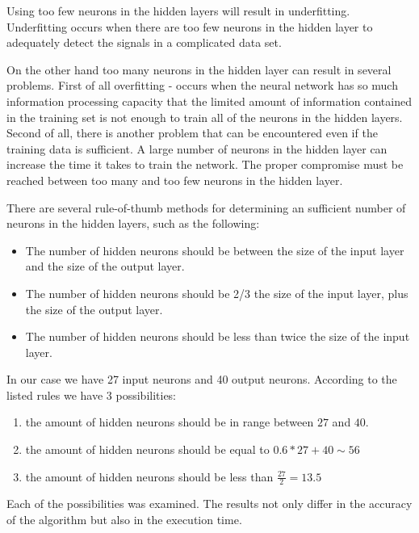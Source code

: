 Using too few neurons in the hidden layers will result in underfitting. Underfitting occurs when there are too few neurons in the hidden layer to adequately detect the signals in a complicated data set.

On the other hand too many neurons in the hidden layer can result in several problems.
First of all overfitting - occurs when the neural network has so much information processing capacity that the limited amount of information contained in the training set is not enough to train all of the neurons in the hidden layers. Second of all, there is another problem that can be encountered even if the training data is sufficient. A large number of neurons in the hidden layer can increase the time it takes to train the network. The proper compromise must be reached between too many and too few neurons in the hidden layer.

There are several rule-of-thumb methods for determining an sufficient number of neurons in the hidden layers, such as the following:

\begin{itemize}
\itemsep0em 
\item The number of hidden neurons should be between the size of the input layer and the size of the output layer.
\item The number of hidden neurons should be 2/3 the size of the input layer, plus the size of the output layer.
\item The number of hidden neurons should be less than twice the size of the input layer.
\end{itemize}

In our case we have 27 input neurons and 40 output neurons. According to the listed rules we have 3 possibilities:

\begin{enumerate}
\itemsep0em 
\item the amount of hidden neurons should be in range between $27$ and $40$. 
\item the amount of hidden neurons should be equal to $0.6 * 27 + 40 \sim 56$
\item the amount of hidden neurons should be less than $\frac{27}{2} = 13.5$
\end{enumerate}

Each of the possibilities was examined. The results not only differ in the accuracy of the algorithm but also in the execution time. 

